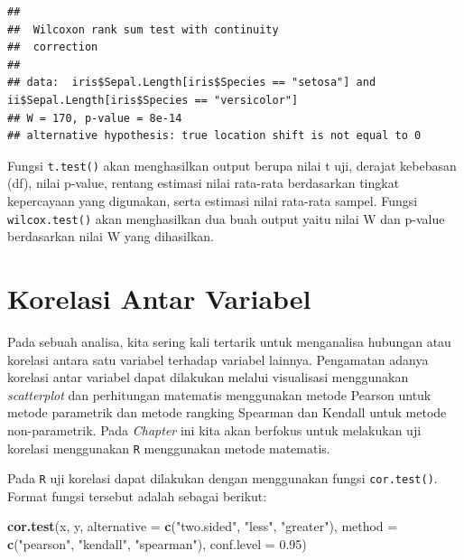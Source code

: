 \documentclass[]{book}
\newenvironment{Shaded}{\begin{snugshade}}{\end{snugshade}}
\newcommand{\DataTypeTok}[1]{\textcolor[rgb]{0.13,0.29,0.53}{#1}}
\newcommand{\FloatTok}[1]{\textcolor[rgb]{0.00,0.00,0.81}{#1}}
\newcommand{\KeywordTok}[1]{\textcolor[rgb]{0.13,0.29,0.53}{\textbf{#1}}}
\newcommand{\NormalTok}[1]{#1}
\newcommand{\StringTok}[1]{\textcolor[rgb]{0.31,0.60,0.02}{#1}}
\theoremstyle{definition}
\theoremstyle{definition}
\theoremstyle{definition}
\theoremstyle{remark}
\begin{document}
\begin{verbatim}
## 
##  Wilcoxon rank sum test with continuity
##  correction
## 
## data:  iris$Sepal.Length[iris$Species == "setosa"] and ii$Sepal.Length[iris$Species == "versicolor"]
## W = 170, p-value = 8e-14
## alternative hypothesis: true location shift is not equal to 0
\end{verbatim}

Fungsi \texttt{t.test()} akan menghasilkan output berupa nilai t uji, derajat kebebasan (df), nilai p-value, rentang estimasi nilai rata-rata berdasarkan tingkat kepercayaan yang digunakan, serta estimasi nilai rata-rata sampel. Fungsi \texttt{wilcox.test()} akan menghasilkan dua buah output yaitu nilai W dan p-value berdasarkan nilai W yang dihasilkan.

\hypertarget{korelasi-antar-variabel}{%
\section{Korelasi Antar Variabel}\label{korelasi-antar-variabel}}

Pada sebuah analisa, kita sering kali tertarik untuk menganalisa hubungan atau korelasi antara satu variabel terhadap variabel lainnya. Pengamatan adanya korelasi antar variabel dapat dilakukan melalui visualisasi menggunakan \emph{scatterplot} dan perhitungan matematis menggunakan metode Pearson untuk metode parametrik dan metode rangking Spearman dan Kendall untuk metode non-parametrik. Pada \emph{Chapter} ini kita akan berfokus untuk melakukan uji korelasi menggunakan \texttt{R} menggunakan metode matematis.

Pada \texttt{R} uji korelasi dapat dilakukan dengan menggunakan fungsi \texttt{cor.test()}. Format fungsi tersebut adalah sebagai berikut:

\begin{Shaded}
\begin{Highlighting}[]
\KeywordTok{cor.test}\NormalTok{(x, y,}
         \DataTypeTok{alternative =} \KeywordTok{c}\NormalTok{(}\StringTok{"two.sided"}\NormalTok{, }\StringTok{"less"}\NormalTok{, }\StringTok{"greater"}\NormalTok{),}
         \DataTypeTok{method =} \KeywordTok{c}\NormalTok{(}\StringTok{"pearson"}\NormalTok{, }\StringTok{"kendall"}\NormalTok{, }\StringTok{"spearman"}\NormalTok{),}
         \DataTypeTok{conf.level =} \FloatTok{0.95}\NormalTok{)}
\end{Highlighting}
\end{Shaded}
\end{document}
